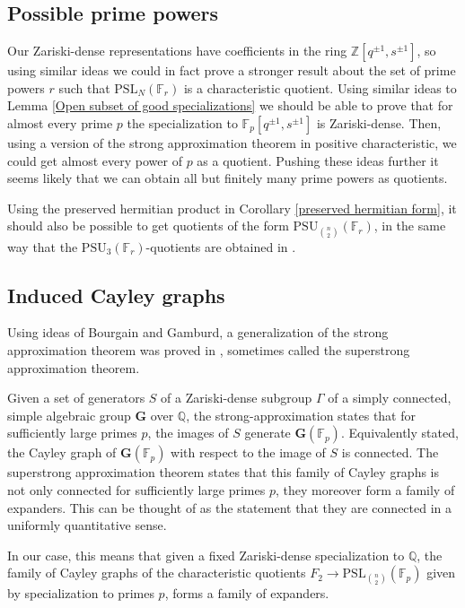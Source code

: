 \documentclass[letterpaper]{amsart}
\begin{document}
\subsection{Possible prime powers}
Our Zariski-dense representations have coefficients in the ring $\mathbb{Z}[q^{\pm 1}, s^{\pm 1}]$, so using similar ideas we could in fact prove a stronger result about the set of prime powers $r$ such that $\mathrm{PSL}_N(\mathbb{F}_r)$ is a characteristic quotient. 
Using similar ideas to Lemma \ref{Open subset of good specializations} we should be able to prove that for almost every prime $p$ the specialization to $\mathbb{F}_p[q^{\pm 1}, s^{\pm 1}]$ is Zariski-dense. Then, using a version of the strong approximation theorem in positive characteristic, we could get almost every power of $p$ as a quotient. Pushing these ideas further it seems likely that we can obtain all but finitely many prime powers as quotients.

Using the preserved hermitian product in Corollary \ref{preserved hermitian form}, it should also be possible to get quotients of the form $\mathrm{PSU}_{\binom{n}{2}}(\mathbb{F}_r)$, in the same way that the $\mathrm{PSU}_3(\mathbb{F}_r)$-quotients are obtained in \cite{chen2025finite}.

\subsection{Induced Cayley graphs}
Using ideas of Bourgain and Gamburd, a generalization of the strong approximation theorem was proved in \cite{golsefidy2012expansion}, sometimes called the superstrong approximation theorem.

Given a set of generators $S$ of a Zariski-dense subgroup $\Gamma$ of a simply connected, simple algebraic group $\textbf{G}$ over $\mathbb{Q}$, the strong-approximation states that for sufficiently large primes $p$, the images of $S$ generate $\textbf{G}(\mathbb{F}_p).$ Equivalently stated, the Cayley graph of $\textbf{G}(\mathbb{F}_p)$ with respect to the image of $S$ is connected. The superstrong approximation theorem states that this family of Cayley graphs is not only connected for sufficiently large primes $p$, they moreover form a family of expanders. This can be thought of as the statement that they are connected in a uniformly quantitative sense.

In our case, this means that given a fixed Zariski-dense specialization to $\mathbb{Q}$, the family of Cayley graphs of the characteristic quotients $F_2 \to \mathrm{PSL}_{\binom{n}{2}}(\mathbb{F}_p)$ given by specialization to primes $p$, forms a family of expanders.
\end{document}
